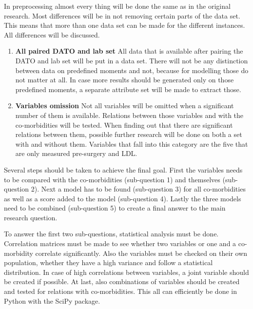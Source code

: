 \documentclass[10pt,a4paper]{article}
\begin{document}
	In preprocessing almost every thing will be done the same as in the original research. Most differences will be in not removing certain parts of the data set. This means that more than one data set can be made for the different instances. All differences will be discussed.
	
		\begin{enumerate}
		\item \textbf{All paired DATO and lab set} All data that is available after pairing the DATO and lab set will be put in a data set. There will not be any distinction between data on predefined moments and not, because for modelling those do not matter at all. In case more results should be generated only on those predefined moments, a separate attribute set will be made to extract those.
		
		\item \textbf{Variables omission} Not all variables will be omitted when a significant number of them is available. Relations between those variables and with the co-morbidities will be tested. When finding out that there are significant relations between them, possible further research will be done on both a set with and without them. Variables that fall into this category are the five that are only measured pre-surgery and LDL.
		
	\end{enumerate}
	
	Several steps should be taken to achieve the final goal. First the variables needs to be compared with the co-morbidities (sub-question 1) and themselves (sub-question 2). Next a model has to be found (sub-question 3) for all co-morbidities as well as a score added to the model (sub-question 4). Lastly the three models need to be combined (sub-question 5) to create a final answer to the main research question.
	
	To answer the first two sub-questions, statistical analysis must be done. Correlation matrices must be made to see whether two variables or one and a co-morbidity correlate significantly. Also the variables must be checked on their own population, whether they have a high variance and follow a statistical distribution. In case of high correlations between variables, a joint variable should be created if possible. At last, also combinations of variables should be created and tested for relations with co-morbidities. This all can efficiently be done in Python with the SciPy package.
	
\end{document}
